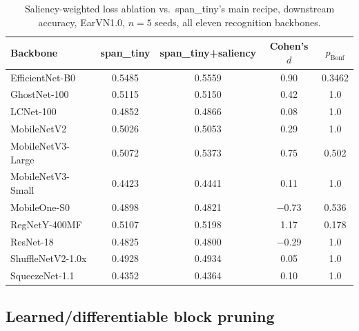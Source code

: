 \documentclass[11pt]{article}
\begin{document}
\begin{table}[H]
\centering
\caption{Saliency-weighted loss ablation vs.\ span\_tiny's main recipe, downstream accuracy, EarVN1.0, $n=5$ seeds, all eleven recognition backbones.}
\label{tab:saliency-ablation}
\begin{tabular}{lcccc}
\toprule
Backbone & span\_tiny & span\_tiny+saliency & Cohen's $d$ & $p_{\text{Bonf}}$ \\
\midrule
EfficientNet-B0     & 0.5485 & 0.5559 & 0.90  & 0.3462 \\
GhostNet-100        & 0.5115 & 0.5150 & 0.42  & 1.0    \\
LCNet-100           & 0.4852 & 0.4866 & 0.08  & 1.0    \\
MobileNetV2         & 0.5026 & 0.5053 & 0.29  & 1.0    \\
MobileNetV3-Large   & 0.5072 & 0.5373 & 0.75  & 0.502  \\
MobileNetV3-Small   & 0.4423 & 0.4441 & 0.11  & 1.0    \\
MobileOne-S0        & 0.4898 & 0.4821 & $-$0.73 & 0.536  \\
RegNetY-400MF       & 0.5107 & 0.5198 & 1.17  & 0.178  \\
ResNet-18           & 0.4825 & 0.4800 & $-$0.29 & 1.0    \\
ShuffleNetV2-1.0x   & 0.4928 & 0.4934 & 0.05  & 1.0    \\
SqueezeNet-1.1      & 0.4352 & 0.4364 & 0.10  & 1.0    \\
\bottomrule
\end{tabular}
\end{table}

\subsection{Learned/differentiable block pruning}
\end{document}
